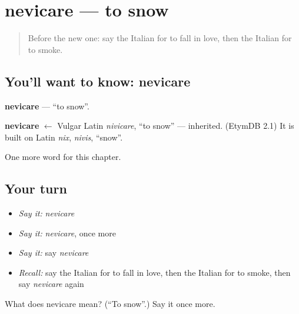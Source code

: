 \section[nevicare]{nevicare — to snow}

\label{lesson:IT-C144-nevicare}



\begin{quote}
Before the new one: say the Italian for to fall in love, then the Italian for to smoke.
\end{quote}

\subsection*{You'll want to know: nevicare}
\textbf{nevicare} — \textquotedblleft{}to snow\textquotedblright{}.

\begin{cousinweb}
\textbf{nevicare} $\leftarrow$ Vulgar Latin \emph{nivicare}, \textquotedblleft{}to snow\textquotedblright{} — inherited. (EtymDB 2.1) It is built on Latin \emph{nix}, \emph{nivis}, \textquotedblleft{}snow\textquotedblright{}.
\end{cousinweb}

\begin{grammarlens}[title={What you've built}]
One more word for this chapter.
\end{grammarlens}

\subsection*{Your turn}
\begin{itemize}
\raggedright
  \item \emph{Say it:} \emph{nevicare}
  \item \emph{Say it:} \emph{nevicare}, once more
  \item \emph{Say it:} say \emph{nevicare}
  \item \emph{Recall:} say the Italian for to fall in love, then the Italian for to smoke, then say \emph{nevicare} again
\end{itemize}

\begin{tcolorbox}[breakable,colback=teal!4,colframe=teal!35!black,title={Before you move on}]
What does nevicare mean? (\textquotedblleft{}To snow\textquotedblright{}.) Say it once more.
\end{tcolorbox}
